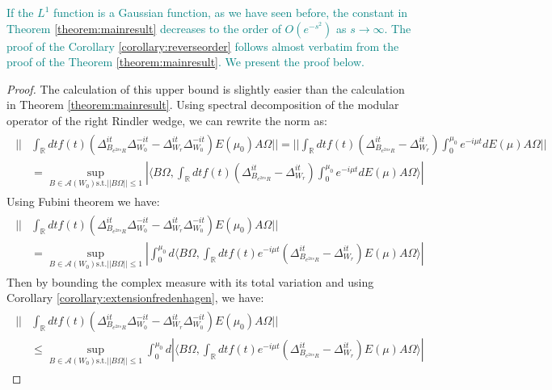 \documentclass[a4paper,11pt]{article}
\theoremstyle{definition}
\newcommand{\lb}{\left(}
\newcommand{\rb}{\right)}
\newcommand{\YC}[1]{\textcolor{teal}{#1}}
\begin{document}
\YC{
If the $L^1$ function is a Gaussian function, as we have seen before, the constant in Theorem \ref{theorem:mainresult} decreases to the order of $O(e^{-s^2})$ as $s\rightarrow\infty$.
}
\YC{
The proof of the Corollary \ref{corollary:reverseorder} follows almost verbatim from the proof of the Theorem \ref{theorem:mainresult}. We present the proof below. }   
\begin{proof}
The calculation of this upper bound is slightly easier than the calculation in Theorem \ref{theorem:mainresult}. Using spectral decomposition of the modular operator of the right Rindler wedge, we can rewrite the norm as:
\begin{align}
    \begin{split}
        ||&\int_\mathbb{R} dt f(t)\lb\Delta_{B_{e^{2
        \pi s}R}}^{it}\Delta_{W_0}^{-it} - \Delta_{W_r}^{it}\Delta_{W_0}^{-it}\rb E(\mu_0)A\Omega|| = ||\int_\mathbb{R} dt f(t)\lb\Delta_{B_{e^{2\pi s}R}}^{it} - \Delta_{W_r}^{it}\rb \int_0^{\mu_0}e^{-i\mu t}dE(\mu) A\Omega||
        \\&
        =\sup_{B\in\mathcal{A}(W_0)\text{s.t.}||B\Omega||\leq 1}|\langle B\Omega, \int_\mathbb{R} dt f(t)\lb\Delta_{B_{e^{2\pi s}R}}^{it} - \Delta_{W_r}^{it}\rb\int_0^{\mu_0}e^{-i\mu t}dE(\mu) A\Omega\rangle|
    \end{split}
\end{align}
Using Fubini theorem we have:
\begin{align}
    \begin{split}
        ||&\int_\mathbb{R} dt f(t)\lb\Delta_{B_{e^{2
        \pi s}R}}^{it}\Delta_{W_0}^{-it} - \Delta_{W_r}^{it}\Delta_{W_0}^{-it}\rb E(\mu_0)A\Omega|| \\&= \sup_{B\in\mathcal{A}(W_0)\text{s.t.}||B\Omega||\leq 1}|\int_0^{\mu_0}d\langle B\Omega, \int_\mathbb{R} dt f(t)e^{-i\mu t}\lb\Delta_{B_{e^{2\pi s}R}}^{it} - \Delta_{W_r}^{it}\rb E(\mu)A\Omega\rangle|
    \end{split}
\end{align}
Then by bounding the complex measure with its total variation and using Corollary \ref{corollary:extensionfredenhagen}, we have:
\begin{align}
    \begin{split}
        ||&\int_\mathbb{R} dt f(t)\lb\Delta_{B_{e^{2
        \pi s}R}}^{it}\Delta_{W_0}^{-it} - \Delta_{W_r}^{it}\Delta_{W_0}^{-it}\rb E(\mu_0)A\Omega||\\&
        \leq \sup_{B\in\mathcal{A}(W_0)\text{s.t.}||B\Omega||\leq 1}\int_0^{\mu_0}d|\langle B\Omega, \int_\mathbb{R} dt f(t)e^{-i\mu t}\lb\Delta_{B_{e^{2\pi s}R}}^{it} - \Delta_{W_r}^{it}\rb E(\mu) A\Omega\rangle|

\end{split}
\end{align}
\end{proof}
\end{document}
